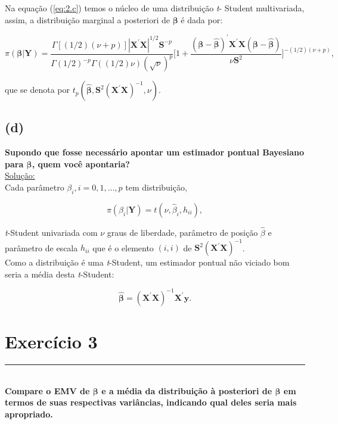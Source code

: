 \documentclass[12pt, oldfontcommands]{article}\usepackage[]{graphicx}\usepackage[]{color}
\newcommand{\horrule}[1]{\rule{\linewidth}{#1}}
\begin{document}
Na equação (\ref{eq:2.c}) temos o núcleo de uma distribuição \textit{t}-
Student multivariada, assim, a distribuição marginal a posteriori de
\(\bm{\beta}\) é dada por:

\[ \pi(\bm{\beta}|\mathbf{Y}) =
   \frac{\Gamma [(1/2)(\nu + p)]|\mathbf{X}^{'}\mathbf{X}|^{1/2}
         \mathbf{S}^{-p}}{\Gamma(1/2)^{-p}\Gamma((1/2)\nu)
                          (\sqrt{\nu})^{p}}
   \bigg[1 + \frac{(\bm{\beta} - \hat{\bm{\beta}})^{'}
   \mathbf{X}^{'}\mathbf{X}(\bm{\beta} - \hat{\bm{\beta}})}{
   \nu\mathbf{S}^{2}}\bigg]^{-(1/2)(\nu + p)}, \]

que se denota por \(t_{p}(\hat{\bm{\beta}},
\mathbf{S}^{2}(\mathbf{X}^{'}\mathbf{X})^{-1}, \nu)\).

\subsection*{(d)} 

\textbf{Supondo que fosse necessário apontar um estimador pontual
        Bayesiano para \(\bm{\beta}\), quem você apontaria?} \\

\underline{Solução:} \\

Cada parâmetro \(\beta_{i}, i = 0, 1, ..., p\) tem distribuição,

\[ \pi(\beta_{i}|\mathbf{Y}) = t(\nu, \hat{\beta}_{i}, h_{ii}), \]

\textit{t}-Student univariada com \(\nu\) graus de liberdade, parâmetro
de posição \(\hat{\beta}\) e parâmetro de escala \(h_{ii}\) que é o
elemento \((i, i)\) de \(\mathbf{S}^{2}(\mathbf{X}^{'}\mathbf{X})^{-1}\).
\\

Como a distribuição é uma \textit{t}-Student, um estimador pontual não
viciado bom seria a média desta \textit{t}-Student:

\[ \hat{\bm{\beta}} =
   (\mathbf{X}^{'} \mathbf{X})^{-1} \mathbf{X}^{'} \mathbf{y}. \]

\section*{Exercício 3} 

\horrule{1pt} \\

\textbf{Compare o EMV de \(\bm{\beta}\) e a média da distribuição à
        posteriori de \(\bm{\beta}\) em termos de suas respectivas
        variâncias, indicando qual deles seria mais apropriado.} \\
\end{document}
